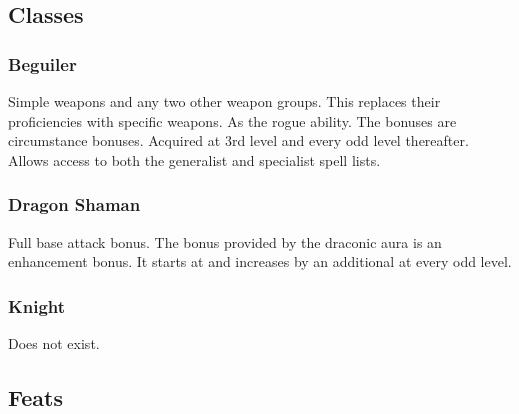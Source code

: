 \subsection{Classes}
\subsubsection{Beguiler}
 Simple weapons and any two other weapon groups. This replaces their proficiencies with specific weapons.
 As the rogue ability.
 The bonuses are circumstance bonuses.
 Acquired at 3rd level and every odd level thereafter. Allows access to both the generalist and specialist spell lists.
\subsubsection{Dragon Shaman}
 Full base attack bonus.
 The bonus provided by the draconic aura is an enhancement bonus. It starts at  and increases by an additional  at every odd level.
\subsubsection{Knight}
Does not exist.
\subsection{Feats}
